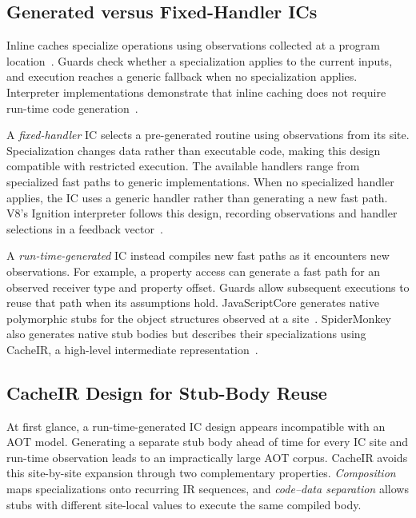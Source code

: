 \documentclass[sigplan,screen,review,anonymous]{acmart}
\begin{document}
\subsection{Generated versus Fixed-Handler ICs}


Inline caches specialize operations using observations collected at a program location~\cite{deutsch1984smalltalk}. Guards check whether a specialization applies to the current inputs, and execution reaches a generic fallback when no specialization applies. Interpreter implementations demonstrate that inline caching does not require run-time code generation~\cite{brunthaler2010quickening}.

A \emph{fixed-handler} IC selects a pre-generated routine using observations from its site. Specialization changes data rather than executable code, making this design compatible with restricted execution. The available handlers range from specialized fast paths to generic implementations. When no specialized handler applies, the IC uses a generic handler rather than generating a new fast path. V8's Ignition interpreter follows this design, recording observations and handler selections in a feedback vector~\cite{alle2018codecaching}.

A \emph{run-time-generated} IC instead compiles new fast paths as it encounters new observations. For example, a property access can generate a fast path for an observed receiver type and property offset. Guards allow subsequent executions to reuse that path when its assumptions hold. JavaScriptCore generates native polymorphic stubs for the object structures observed at a site~\cite{henderson2023ic}. SpiderMonkey also generates native stub bodies but describes their specializations using CacheIR, a high-level intermediate representation~\cite {demooij2023cacheir}.

\subsection{CacheIR Design for Stub-Body Reuse}

At first glance, a run-time-generated IC design appears incompatible with an AOT model. Generating a separate stub body ahead of time for every IC site and run-time observation leads to an impractically large AOT corpus. CacheIR avoids this site-by-site expansion through two complementary properties. \emph{Composition} maps specializations onto recurring IR sequences, and \emph{code--data separation} allows stubs with different site-local values to execute the same compiled body.
\end{document}
